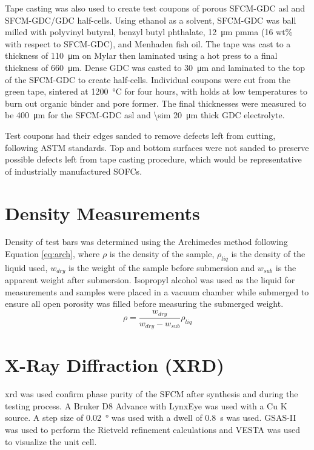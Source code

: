         Tape casting was also used to create test coupons of porous SFCM-GDC \gls{asl} and SFCM-GDC/GDC half-cells.
        Using ethanol as a solvent, SFCM-GDC was ball milled with polyvinyl butyral, benzyl butyl phthalate, \SI{12}{\micro\meter} \gls{pmma} (16 wt\% with respect to SFCM-GDC), and Menhaden fish oil.
        The tape was cast to a thickness of \SI{110}{\micro\meter} on Mylar then laminated using a hot press to a final thickness of \SI{660}{\micro\meter}.
        Dense GDC was casted to \SI{30}{\micro\meter} and laminated to the top of the SFCM-GDC to create half-cells.
        Individual coupons were cut from the green tape, sintered at \SI{1200}{\celsius} for four hours, with holds at low temperatures to burn out organic binder and pore former.
        The final thicknesses were measured to be \SI{400}{\micro\meter} for the SFCM-GDC \gls{asl} and \SI{\sim 20}{\micro\meter} thick GDC electrolyte.

        Test coupons had their edges sanded to remove defects left from cutting, following ASTM standards.\cite{ASTM2008}
        Top and bottom surfaces were not sanded to preserve possible defects left from tape casting procedure, which would be representative of industrially manufactured SOFCs.

\section{Density Measurements}
    Density of test bars was determined using the Archimedes method following Equation \ref{eq:arch}, where $\rho$ is the density of the sample, $\rho_{liq}$ is the density of the liquid used, $w_{dry}$ is the weight of the sample before submersion and $w_{sub}$ is the apparent weight after submersion.
    Isopropyl alcohol was used as the liquid for measurements and samples were placed in a vacuum chamber while submerged to ensure all open porosity was filled before measuring the submerged weight.
    \begin{equation}
    \rho = \frac{w_{dry}}{w_{dry}-w_{sub}}\rho_{liq}
    \label{eq:arch}
    \end{equation}

\section{X-Ray Diffraction (XRD)}
    \Gls{xrd} was used confirm phase purity of the SFCM after synthesis and during the testing process.
    A Bruker D8 Advance with LynxEye was used with a Cu K\textsubscript{\textalpha{}} source.
    A step size of \SI{0.02}{\degree} was used with a dwell of \SI{0.8}{\second} was used.
    GSAS-II was used to perform the Rietveld refinement calculations and VESTA was used to visualize the unit cell.\cite{Toby2013,Momma2011}

